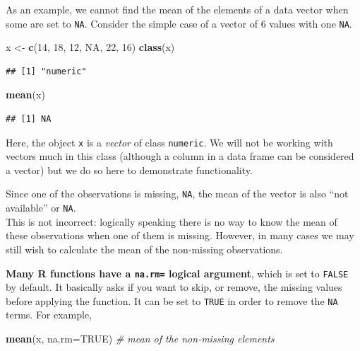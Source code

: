 \documentclass[
]{book}
\newenvironment{Shaded}{\begin{snugshade}}{\end{snugshade}}
\newcommand{\AttributeTok}[1]{\textcolor[rgb]{0.13,0.29,0.53}{#1}}
\newcommand{\CommentTok}[1]{\textcolor[rgb]{0.56,0.35,0.01}{\textit{#1}}}
\newcommand{\ConstantTok}[1]{\textcolor[rgb]{0.56,0.35,0.01}{#1}}
\newcommand{\DecValTok}[1]{\textcolor[rgb]{0.00,0.00,0.81}{#1}}
\newcommand{\FunctionTok}[1]{\textcolor[rgb]{0.13,0.29,0.53}{\textbf{#1}}}
\newcommand{\NormalTok}[1]{#1}
\newcommand{\OtherTok}[1]{\textcolor[rgb]{0.56,0.35,0.01}{#1}}
\begin{document}
As an example, we cannot find the mean of the elements of a data vector when some are set to \texttt{NA}. Consider the simple case of a vector of 6 values with one \texttt{NA}.

\begin{Shaded}
\begin{Highlighting}[]
\NormalTok{x }\OtherTok{\textless{}{-}} \FunctionTok{c}\NormalTok{(}\DecValTok{14}\NormalTok{, }\DecValTok{18}\NormalTok{, }\DecValTok{12}\NormalTok{, }\ConstantTok{NA}\NormalTok{, }\DecValTok{22}\NormalTok{, }\DecValTok{16}\NormalTok{)}
\FunctionTok{class}\NormalTok{(x)}
\end{Highlighting}
\end{Shaded}

\begin{verbatim}
## [1] "numeric"
\end{verbatim}

\begin{Shaded}
\begin{Highlighting}[]
\FunctionTok{mean}\NormalTok{(x)}
\end{Highlighting}
\end{Shaded}

\begin{verbatim}
## [1] NA
\end{verbatim}

Here, the object \texttt{x} is a \emph{vector} of class \texttt{numeric}. We will not be working with vectors much in this class (although a column in a data frame can be considered a vector) but we do so here to demonstrate functionality.

Since one of the observations is missing, \texttt{NA}, the mean of the vector is also ``not available'' or \texttt{NA}.\\
This is not incorrect: logically speaking there is no way to know the mean of these observations when one of them is missing. However, in many cases we may still wish to calculate the mean of the non-missing observations.

\textbf{Many R functions have a \texttt{na.rm=} logical argument}, which is set to \texttt{FALSE} by default. It basically asks if you want to skip, or remove, the missing values before applying the function. It can be set to \texttt{TRUE} in order to remove the \texttt{NA} terms. For example,

\begin{Shaded}
\begin{Highlighting}[]
\FunctionTok{mean}\NormalTok{(x, }\AttributeTok{na.rm=}\ConstantTok{TRUE}\NormalTok{)    }\CommentTok{\# mean of the non{-}missing elements}
\end{Highlighting}
\end{Shaded}
\end{document}

